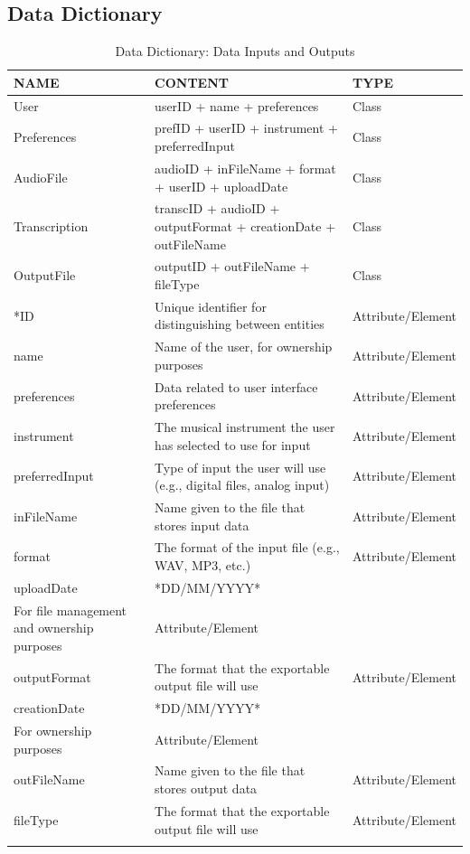 \documentclass[12pt]{article}
\begin{document}
\subsection{Data Dictionary}
\begingroup
\renewcommand{\arraystretch}{1.25}
\begin{longtable}{|>{\raggedright}p{3cm}|>{\raggedright}p{5.5cm}|>{\raggedright\arraybackslash}p{4cm}|}
  \hline
  NAME & CONTENT & TYPE \\
  \hline
  User & userID + name + preferences & Class\\
  \hline
  Preferences & prefID + userID + instrument + preferredInput & Class \\
  \hline
  AudioFile & audioID + inFileName + format + userID + uploadDate & Class\\
  \hline
  Transcription & transcID + audioID + outputFormat + creationDate + outFileName  & Class \\
  \hline
  OutputFile & outputID + outFileName + fileType  & Class \\
  \hline
  *ID & Unique identifier for distinguishing between entities & Attribute/Element \\
  \hline
  name & Name of the user, for ownership purposes  & Attribute/Element \\
  \hline
  preferences & Data related to user interface preferences  & Attribute/Element \\
  \hline
  instrument & The musical instrument the user has selected to use for input  & Attribute/Element \\
  \hline
  preferredInput & Type of input the user will use (e.g., digital files, analog input)  & Attribute/Element \\
  \hline
  inFileName & Name given to the file that stores input data & Attribute/Element \\
  \hline
  format & The format of the input file (e.g., WAV, MP3, etc.) & Attribute/Element \\
  \hline
  uploadDate & *DD/MM/YYYY*\\ For file management and ownership purposes & Attribute/Element \\
  \hline
  outputFormat & The format that the exportable output file will use & Attribute/Element \\
  \hline
  creationDate & *DD/MM/YYYY*\\For ownership purposes & Attribute/Element \\
  \hline
  outFileName & Name given to the file that stores output data & Attribute/Element \\
  \hline
  fileType & The format that the exportable output file will use & Attribute/Element \\
  \hline
  \caption{Data Dictionary: Data Inputs and Outputs}
\end{longtable}
\endgroup
\end{document}
